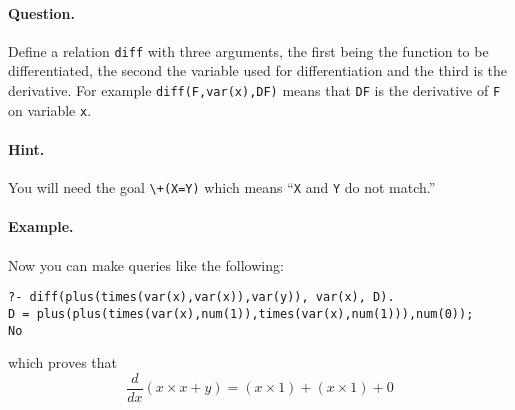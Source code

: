 \paragraph{Question.} Define a relation \texttt{diff} with
three arguments, the first being the function to be differentiated,
the second the variable used for differentiation and the third is the
derivative. For example \texttt{diff(F,var(x),DF)} means that
\texttt{DF} is the derivative of \texttt{F} on variable \texttt{x}.

\paragraph{Hint.} You will need the goal \verb|\+(X=Y)| which
means ``\texttt{X} and \texttt{Y} do not match.''

\paragraph{Example.} Now you can make queries like the following: 
{\small
\begin{verbatim}
?- diff(plus(times(var(x),var(x)),var(y)), var(x), D).
D = plus(plus(times(var(x),num(1)),times(var(x),num(1))),num(0));
No
\end{verbatim}
}
\noindent which proves that
\[
\frac{d}{dx}(x \times x + y) = (x \times 1) + (x \times 1) + 0
\]

